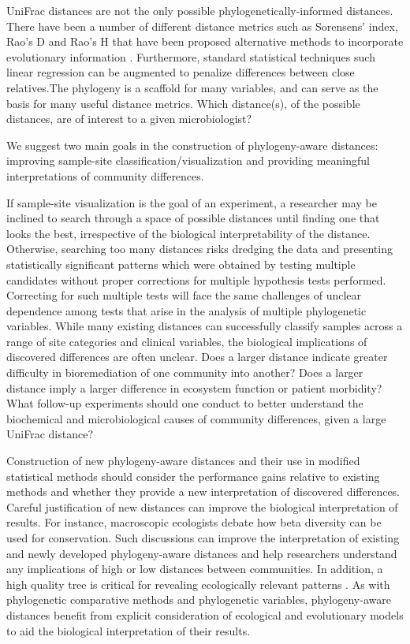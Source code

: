 UniFrac distances are not the only possible phylogenetically-informed distances.  There have been a number of different distance metrics such as Sorensens' index, Rao's D and Rao's H that have been proposed alternative methods to incorporate evolutionary information \cite{Silverman2016-he}.  Furthermore, standard statistical techniques such linear regression can be augmented to penalize differences between close relatives\cite{phylogenetic_cca,purdom,fukuyama_perturbation}.The phylogeny is a scaffold for many variables, and can serve as the basis for many useful distance metrics. Which distance(s), of the possible distances, are of interest to a given microbiologist? \par
We suggest two main goals in the construction of phylogeny-aware distances: improving sample-site classification/visualization and providing meaningful interpretations of community differences. \par
If sample-site visualization is the goal of an experiment, a researcher may be inclined to search through a space of possible distances until finding one that looks the best, irrespective of the biological interpretability of the distance. Otherwise, searching too many distances risks dredging the data and presenting statistically significant patterns which were obtained by testing multiple candidates without proper corrections for multiple hypothesis tests performed. Correcting for such multiple tests will face the same challenges of unclear dependence among tests that arise in the analysis of multiple phylogenetic variables.
While many existing distances can successfully classify samples across a range of site categories and clinical variables, the biological implications of discovered differences are often unclear. Does a larger distance indicate greater difficulty in bioremediation of one community into another? Does a larger distance imply a larger difference in ecosystem function or patient morbidity? What follow-up experiments should one conduct to better understand the biochemical and microbiological causes of community differences, given a large UniFrac distance?\par
Construction of new phylogeny-aware distances and their use in modified statistical methods should consider the performance gains relative to existing methods and whether they provide a new interpretation of discovered differences. Careful justification of new distances can improve the biological interpretation of results. For instance, macroscopic ecologists debate how beta diversity can be used for conservation\cite{socolar_beta_diversity}. Such discussions can improve the interpretation of existing and newly developed phylogeny-aware distances and help researchers understand any implications of high or low distances between communities. In addition, a high quality tree is critical for revealing ecologically relevant patterns \cite{fast_unifrac}.  As with phylogenetic comparative methods and phylogenetic variables, phylogeny-aware distances benefit from explicit consideration of ecological and evolutionary models to aid the biological interpretation of their results.

